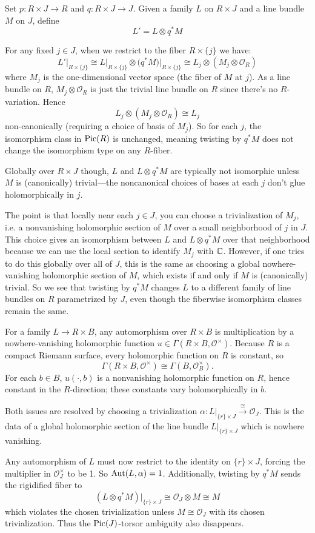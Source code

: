 \documentclass[12pt]{article}
\begin{document}
\begin{remark}
    Set $p:R\times J\to R$ and $q:R\times J\to J$. Given a family $L$ on $R\times J$ and a line bundle $M$ on $J$, define
\[
L' = L\otimes q^*M
\]

For any fixed $j\in J$, when we restrict to the fiber $R\times\{j\}$ we have:
\[
L'\big|_{R\times\{j\}} \cong L\big|_{R\times\{j\}} \otimes \big(q^*M\big)\big|_{R\times\{j\}} \cong L_j \otimes (M_j\otimes \mathcal{O}_R)
\]
where $M_j$ is the one-dimensional vector space (the fiber of $M$ at $j$). As a line bundle on $R$, $M_j\otimes \mathcal{O}_R$ is just the trivial line bundle on $R$ since there's no $R$-variation. Hence
\[
L_j \otimes (M_j\otimes \mathcal{O}_R) \cong L_j
\]
non-canonically (requiring a choice of basis of $M_j$). So for each $j$, the isomorphism class in $\operatorname{Pic}(R)$ is unchanged, meaning twisting by $q^*M$ does not change the isomorphism type on any $R$-fiber.

Globally over $R\times J$ though, $L$ and $L\otimes q^*M$ are typically not isomorphic unless $M$ is (canonically) trivial—the noncanonical choices of bases at each $j$ don't glue holomorphically in $j$.

The point is that locally near each $j\in J$, you can choose a trivialization of $M_j$, i.e. a nonvanishing holomorphic section of $M$ over a small neighborhood of $j$ in $J$. This choice gives an isomorphism between $L$ and $L\otimes q^*M$ over that neighborhood because we can use the local section to identify $M_j$ with $\mathbb{C}$. However, if one tries to do this globally over all of $J$, this is the same as choosing a global nowhere-vanishing holomorphic section of $M$, which exists if and only if $M$ is (canonically) trivial. So we see that twisting by $q^*M$ changes $L$ to a different family of line bundles on $R$ parametrized by $J$, even though the fiberwise isomorphism classes remain the same.

For a family $L \to R \times B$, any automorphism over $R \times B$ is multiplication by a nowhere-vanishing holomorphic function $u \in \Gamma(R \times B, \mathcal{O}^\times)$. Because $R$ is a compact Riemann surface, every holomorphic function on $R$ is constant, so
\[
\Gamma(R \times B, \mathcal{O}^\times) \cong \Gamma(B, \mathcal{O}_B^\times).
\]
For each $b \in B$, $u(\cdot,b)$ is a nonvanishing holomorphic function on $R$, hence constant in the $R$-direction; these constants vary holomorphically in $b$.


Both issues are resolved by choosing a trivialization $\alpha: L|_{\{r\}\times J} \xrightarrow{\cong} \mathcal{O}_J$. This is the data of a global holomorphic section of the line bundle $L|_{\{r\}\times J}$ which is nowhere vanishing.

Any automorphism of $L$ must now restrict to the identity on $\{r\}\times J$, forcing the multiplier in $\mathcal{O}_J^\times$ to be 1. So $\operatorname{Aut}(L,\alpha)=1$. Additionally, twisting by $q^*M$ sends the rigidified fiber to
\[
(L\otimes q^*M)|_{\{r\}\times J} \cong \mathcal{O}_J \otimes M \cong M
\]
which violates the chosen trivialization unless $M\cong\mathcal{O}_J$ with its chosen trivialization. Thus the $\operatorname{Pic}(J)$-torsor ambiguity also disappears.
\end{remark}
\end{document}
